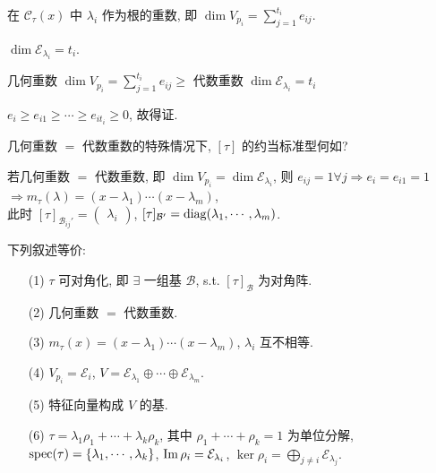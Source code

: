 \documentclass{note}
\begin{document}
\begin{df}[代数重数]
    在 $\mathcal{C}_{\tau}(x)$ 中 $\lambda_i$ 作为根的重数, 即 $\dim V_{p_i}=\sum_{j=1}^{t_i}e_{ij}$.
\end{df}

\begin{df}[几何重数]
    $\dim\mathcal{E}_{\lambda_i}=t_i$.
\end{df}

\begin{thm}[(课本定理 8.5)]
    几何重数 $\dim V_{p_i}=\sum_{j=1}^{t_i}e_{ij}\geq$ 代数重数 $\dim\mathcal{E}_{\lambda_i}=t_i$
\end{thm}
\begin{pf}
    $e_i\geq e_{i1}\geq\cdots\geq e_{it_i}\geq 0$, 故得证.
\end{pf}

几何重数 $=$ 代数重数的特殊情况下, $[\tau]$ 的约当标准型何如?

若几何重数 $=$ 代数重数, 即 $\dim V_{p_i}=\dim\mathcal{E}_{\lambda_i}$, 则 $e_{ij}=1\forall j\Longrightarrow e_i=e_{i1}=1$\\
$\Longrightarrow m_{\tau}(\lambda)=(x-\lambda_1)\cdots(x-\lambda_m)$,\\
此时 $[\tau]_{\mathcal{B}_{ij}'}=\begin{pmatrix}
    \lambda_i
\end{pmatrix}$, $[\tau]_{\mathcal{B}'}=\operatorname{diag}(\lambda_1,\cdots,\lambda_m)$.

\begin{thm}[(课本定理 8.10, 8.11, 8.18)]\label{thm-8.10-8.11-8.18}
    下列叙述等价:
    \begin{itemize}
        \item[(1)] $\tau$ 可对角化, 即 $\exists$ 一组基 $\mathcal{B}$, s.t. $[\tau]_{\mathcal{B}}$ 为对角阵.
        \item[(2)] 几何重数 $=$ 代数重数.
        \item[(3)] $m_{\tau}(x)=(x-\lambda_1)\cdots(x-\lambda_m)$, $\lambda_i$ 互不相等.
        \item[(4)] $V_{p_i}=\mathcal{E}_i$, $V=\mathcal{E}_{\lambda_1}\oplus\cdots\oplus\mathcal{E}_{\lambda_m}$.
        \item[(5)] 特征向量构成 $V$ 的基.
        \item[(6)] $\tau=\lambda_1\rho_1+\cdots+\lambda_k\rho_k$, 其中 $\rho_1+\cdots+\rho_k=1$ 为单位分解, $\operatorname{spec}(\tau)=\{\lambda_1,\cdots,\lambda_k\}$, $\operatorname{Im}\rho_i=\mathcal{E}_{\lambda_i}$, $\ker\rho_i=\bigoplus_{j\neq i}\mathcal{E}_{\lambda_j}$.
    \end{itemize}
\end{thm}
\end{document}

